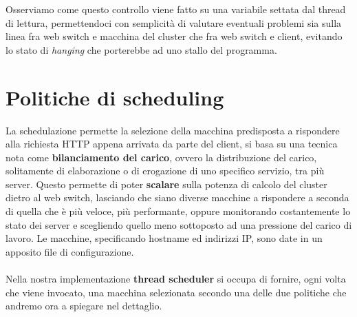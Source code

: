 \documentclass[italian]{tktltiki2}
\begin{document}
Osserviamo come questo controllo viene fatto su una variabile settata dal thread di lettura, permettendoci con semplicità di valutare eventuali problemi sia sulla linea fra web switch e macchina del cluster che fra web switch e client, evitando lo stato di \emph{hanging} che porterebbe ad uno stallo del programma.
\newpage
\section{Politiche di scheduling}
 \label{sec: sched_p}
La schedulazione permette la selezione della macchina predisposta a rispondere alla richiesta HTTP appena arrivata da parte del client, si basa su una tecnica nota come \textbf{bilanciamento del carico}, ovvero la distribuzione del carico, solitamente di elaborazione o di erogazione di uno specifico servizio, tra più server. Questo permette di poter \textbf{scalare} sulla potenza di calcolo del cluster dietro al web switch, lasciando che siano diverse macchine a rispondere a seconda di quella che è più veloce, più performante, oppure monitorando costantemente lo stato dei server e scegliendo quello meno sottoposto ad una pressione del carico di lavoro. Le macchine, specificando hostname ed indirizzi IP, sono date in un apposito file di configurazione.
\\
\\
Nella nostra implementazione \textbf{thread scheduler} si occupa di fornire,  ogni volta che viene invocato, una macchina selezionata secondo una delle due politiche che andremo ora a spiegare nel dettaglio.
\end{document}
